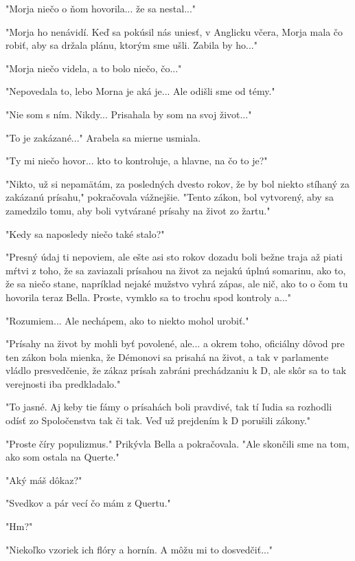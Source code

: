 \documentclass{book}
\begin{document}
"$ $Morja niečo o ňom hovorila... že sa nestal..."$ $ 

"$ $Morja ho nenávidí. Keď sa pokúsil nás uniesť, v Anglicku včera, Morja mala čo robiť, aby sa držala plánu, ktorým sme ušli. Zabila by ho..."$ $ 

"$ $Morja niečo videla, a to bolo niečo, čo..."$ $ 

"$ $Nepovedala to, lebo Morna je aká je... Ale odišli sme od témy."$ $ 

"$ $Nie som s ním. Nikdy... Prisahala by som na svoj život..."$ $ 

"$ $To je zakázané..."$ $  Arabela sa mierne usmiala.

"$ $Ty mi niečo hovor... kto to kontroluje, a hlavne, na čo to je?"$ $ 

"$ $Nikto, už si nepamätám, za posledných dvesto rokov, že by bol niekto stíhaný za zakázanú prísahu,"$ $  pokračovala vážnejšie. "$ $Tento zákon, bol vytvorený, aby sa zamedzilo tomu, aby boli vytvárané prísahy na život zo žartu."$ $ 

"$ $Kedy sa naposledy niečo také stalo?"$ $ 

"$ $Presný údaj ti nepoviem, ale ešte asi sto rokov dozadu boli bežne traja až piati mŕtvi z toho, že sa zaviazali prísahou na život za nejakú úplnú somarinu, ako to, že sa niečo stane, napríklad nejaké mužstvo vyhrá zápas, ale nič, ako to o čom tu hovorila teraz Bella. Proste, vymklo sa to trochu spod kontroly a..."$ $ 

"$ $Rozumiem... Ale nechápem, ako to niekto mohol urobiť."$ $ 

"$ $Prísahy na život by mohli byť povolené, ale... a okrem toho, oficiálny dôvod pre ten zákon bola mienka, že Démonovi sa prisahá na život, a tak v parlamente vládlo presvedčenie, že zákaz prísah zabráni prechádzaniu k D, ale skôr sa to tak verejnosti iba predkladalo."$ $ 

"$ $To jasné. Aj keby tie fámy o prísahách boli pravdivé, tak tí ľudia sa rozhodli odísť zo Spoločenstva tak či tak. Veď už prejdením k D porušili zákony."$ $ 

"$ $Proste číry populizmus."$ $  Prikývla Bella a pokračovala. "$ $Ale skončili sme na tom, ako som ostala na Querte."$ $ 

"$ $Aký máš dôkaz?"$ $ 

"$ $Svedkov a pár vecí čo mám z Quertu."$ $ 

"$ $Hm?"$ $ 

"$ $Niekoľko vzoriek ich flóry a hornín. A môžu mi to dosvedčiť..."$ $ 
\end{document}
